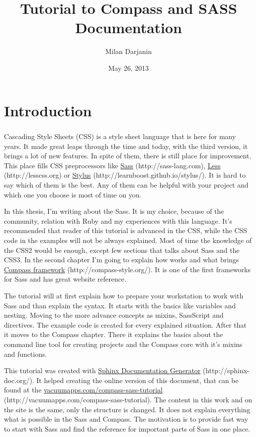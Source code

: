 \documentclass[a4paper,12pt,oneside]{sphinxmanual}
\title{Tutorial to Compass and SASS Documentation}
\date{May 26, 2013}
\author{Milan Darjanin}
\begin{document}
\tableofcontents
{}\label{index::doc}

\chapter*{Introduction}

      \paragraph{}
      Cascading Style Sheets (CSS) is a style sheet language that is here for many years. It made great leaps through the time and today, with the third version, it brings a lot of new features. In spite of them, there is still place for improvement. This place fills CSS preprocessors like \href{http://sass-lang.com}{Sass} (http://sass-lang.com), \href{http://lesscss.org}{Less} (http://lesscss.org) or \href{http://learnboost.github.io/stylus/}{Stylus} (http://learnboost.github.io/stylus/). It is hard to say which of them is the best. Any of them can be helpful with your project and which one you choose is most of time on you.

      In this thesis, I'm writing about the Sass. It is my choice, because of the community, relation with Ruby and my experiences with this language. It's recommended that reader of this tutorial is advanced in the CSS, while the CSS code in the examples will not be always explained. Most of time the knowledge of the CSS2 would be enough, except few sections that talks about Sass and the CSS3. In the second chapter I'm going to explain how works and what brings \href{http://compass-style.org/}{Compass framework} (http://compass-style.org/). It is one of the first frameworks for Sass and has great website reference.

      The tutorial will at first explain how to prepare your workstation to work with Sass and than explain the syntax. It starts with the basics like variables and nesting. Moving to the more advance concepts as mixins, SassScript and directives. The example code is created for every explained situation. After that it moves to the Compass chapter. There it explains the basics about the command line tool for creating projects and the Compass core with it's mixins and functions.

      This tutorial was created with \href{http://sphinx-doc.org/}{Sphinx Documentation Generator} (http://sphinx-doc.org/). It helped creating the online version of this document, that can be found at the \href{http://vacuumapps.com/compass-sass-tutorial}{vacuumapps.com/compass-sass-tutorial} (http://vacuumapps.com/compass-sass-tutorial). The content in this work and on the site is the same, only the structure is changed. It does not explain everything what is possible in the Sass and Compass. The motivation is to provide fast way to start with Sass and find the reference for important parts of Sass in one place.
\end{document}
